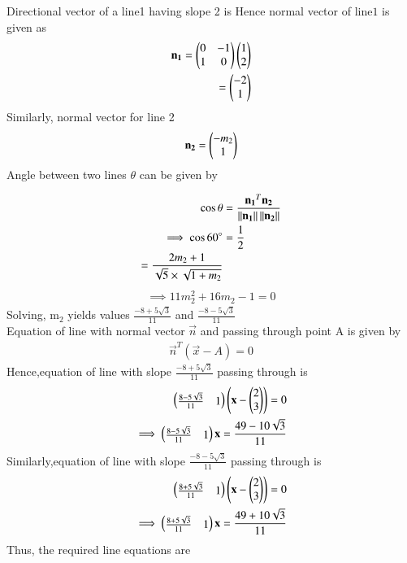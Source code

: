Directional vector of a line1 having slope 2 is 
    Hence normal vector of line$1$ is given as
\begin{align}
\mathbf{n_1} =\begin{pmatrix}0 & -1\\1 & 0\end{pmatrix}\begin{pmatrix}1\\2\end{pmatrix}\\=\begin{pmatrix}-2\\1\end{pmatrix}
\end{align}
Similarly, normal vector for line 2 \\
\begin{align}
\mathbf{n_2} = \begin{pmatrix}-m_2\\1\end{pmatrix}
\end{align}
Angle between two lines $\theta$ can be given by

\begin{align}
\cos \theta &= \frac{\mathbf{n_1}^T\mathbf{n_2}}{\left\lVert\mathbf{n_1}\right\rVert\left\lVert\mathbf{n_2}\right\rVert}\\
\implies \cos 60\degree &=\frac{1}{2}\\ 
=\frac{2m_2+1}{\sqrt5\times\sqrt{1+m_2}}
\end{align}
 \begin{align}
 \implies 11m_2^2+16m_2-1=0
 \end{align}
 Solving, m$_2$ yields values $\frac{-8+5\sqrt{3}}{11}$ and $\frac{-8-5\sqrt{3}}{11}$ \\
 Equation of line with normal vector $\vec{n}$ and passing through point A is given by
 \begin{align}
 \vec{n}^T(\vec{x}-A)=0
 \end{align}
  Hence,equation of line with slope $\frac{-8+5\sqrt{3}}{11}$ passing through  is
  \begin{align}
  \begin{pmatrix}\frac{8-5\sqrt{3}}{11}&1\end{pmatrix}\left(\mathbf{x}-\begin{pmatrix}2\\3\end{pmatrix}\right)=0\\
  \implies \begin{pmatrix}\frac{8-5\sqrt{3}}{11}&1\end{pmatrix}\mathbf{x}=\frac{49-10\sqrt{3}}{11}
  \end{align}
  Similarly,equation of line with slope $\frac{-8-5\sqrt{3}}{11}$ passing through  is
  \begin{align}
  \begin{pmatrix}\frac{8+5\sqrt{3}}{11}&1\end{pmatrix}\left(\mathbf{x}-\begin{pmatrix}2\\3\end{pmatrix}\right)=0\\
  \implies \begin{pmatrix}\frac{8+5\sqrt{3}}{11}&1\end{pmatrix}\mathbf{x}=\frac{49+10\sqrt{3}}{11}
  \end{align}
  Thus, the required line equations are
